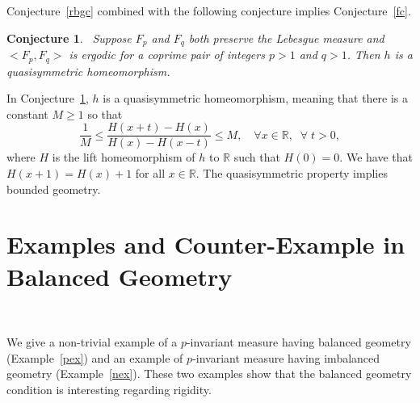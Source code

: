 \documentclass[11pt]{amsart}
\newtheorem{conjecture}{Conjecture}
\theoremstyle{definition}
\def\T{\mathbb{T}}
\begin{document}
Conjecture~\ref{rbgc} combined with the following conjecture implies Conjecture~\ref{fc}.

\medskip
\begin{conjecture}~\label{qsc}
Suppose $F_{p}$ and $F_{q}$ both preserve the Lebesgue measure 
and $<F_{p},F_{q}>$ is ergodic for a coprime pair of integers $p>1$ 
and $q>1$. Then $h$ is a quasisymmetric homeomorphism. 
\end{conjecture}

In Conjecture~\ref{qsc}, $h$ is a quasisymmetric homeomorphism, meaning that there is a constant $M\geq 1$ so that 
$$
\frac{1}{M} \leq \frac{H(x+t)-H(x)}{H(x)-H(x-t)} \leq M, \quad \forall x\in {\mathbb R}, \;\;\forall\; t>0,
$$
where $H$ is the lift homeomorphism of $h$ to ${\mathbb R}$ such that $H(0)=0$. We have that $H(x+1)=H(x)+1$ for all $x\in {\mathbb R}$. The quasisymmetric property implies bounded geometry. 





 \section{\bf Examples and Counter-Example in Balanced Geometry}~\label{enx}
 
We give a non-trivial example of a $p$-invariant measure having balanced geometry (Example~\ref{pex}) and an example of $p$-invariant measure having imbalanced geometry (Example~\ref{nex}). These two examples show that the balanced geometry condition is interesting regarding rigidity.
 
\end{document}
